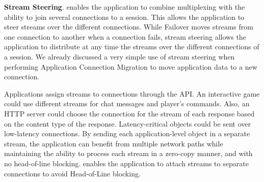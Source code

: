 
\textbf{Stream Steering}. \tcpls enables the application to combine
multiplexing with the ability to join
several \tcp connections to a \tcpls session. This allows the application to
steer \tcpls
streams over the different \tcp connections. While Failover moves
\tcpls streams from one connection to another when a \tcp connection fails, stream
steering allows the application to distribute at any time the streams over the
different
\tcp connections of a \tcpls session. We already discussed a very simple use of
stream steering when performing Application Connection Migration %
to move application data to a new connection.


Applications assign \tcpls streams to \tcp connections through the \tcpls
API.
An interactive game could use different streams for chat messages and player's
commands.  Also, an HTTP server could choose
the \tcp connection for the stream of each response based on the content type of
the response. Latency-critical objects could be sent over
low-latency connections. By sending each application-level object in a separate
stream, the application can benefit from multiple network paths while
maintaining the ability to process each stream in a zero-copy manner, and
with no head-of-line blocking.
\tcpls enables the application to attach streams to separate \tcp connections 
to avoid Head-of-Line blocking. %

